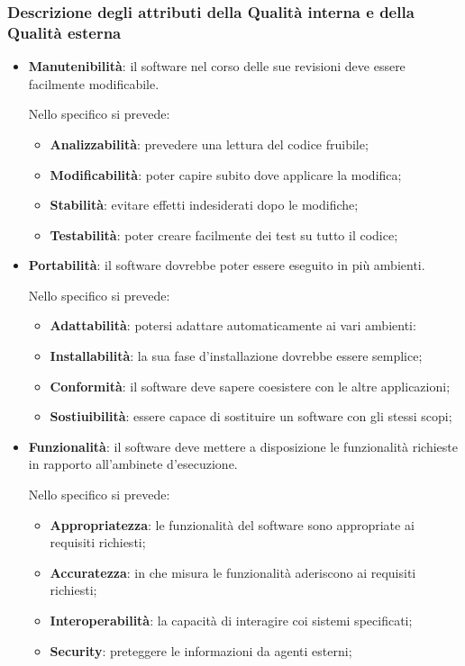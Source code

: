 		\subsubsection{Descrizione degli attributi della Qualità interna e della Qualità esterna}
		\begin{itemize}
			\item \textbf{Manutenibilità}: il software nel corso delle sue revisioni deve essere facilmente modificabile.
			
			Nello specifico si prevede:
			
			\begin{itemize}
				\item \textbf{Analizzabilità}: prevedere una lettura del codice fruibile;
				\item \textbf{Modificabilità}: poter capire subito dove applicare la modifica;
				\item \textbf{Stabilità}: evitare effetti indesiderati dopo le modifiche;
				\item \textbf{Testabilità}: poter creare facilmente dei test su tutto il codice;
			\end{itemize}
		
			\item \textbf{Portabilità}: il software dovrebbe poter essere eseguito in più ambienti.
			
			Nello specifico si prevede:
			
			\begin{itemize}
				\item \textbf{Adattabilità}: potersi adattare automaticamente ai vari ambienti:
				\item \textbf{Installabilità}: la sua fase d'installazione dovrebbe essere semplice;
				\item \textbf{Conformità}: il software deve sapere coesistere con le altre applicazioni;
				\item \textbf{Sostiuibilità}: essere capace di sostituire un software con gli stessi scopi;
			\end{itemize}
		
			\item \textbf{Funzionalità}: il software deve mettere a disposizione le funzionalità richieste in rapporto all'ambinete d'esecuzione.
			
			Nello specifico si prevede:
			
			\begin{itemize}
				\item \textbf{Appropriatezza}: le funzionalità del software sono appropriate ai requisiti richiesti;
				\item \textbf{Accuratezza}: in che misura le funzionalità aderiscono ai requisiti richiesti;
				\item \textbf{Interoperabilità}: la capacità di interagire coi sistemi specificati;
				\item \textbf{Security}: preteggere le informazioni da agenti esterni;
			\end{itemize}
		

\end{itemize}
